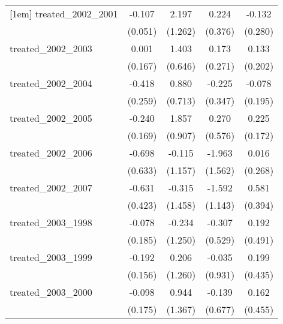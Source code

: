 {\begin{tabular}{l*{4}{c}}
[1em]
treated\_2002\_2001&      -0.107\sym{*}  &       2.197         &       0.224         &      -0.132         \\
            &     (0.051)         &     (1.262)         &     (0.376)         &     (0.280)         \\
[1em]
treated\_2002\_2003&       0.001         &       1.403\sym{*}  &       0.173         &       0.133         \\
            &     (0.167)         &     (0.646)         &     (0.271)         &     (0.202)         \\
[1em]
treated\_2002\_2004&      -0.418         &       0.880         &      -0.225         &      -0.078         \\
            &     (0.259)         &     (0.713)         &     (0.347)         &     (0.195)         \\
[1em]
treated\_2002\_2005&      -0.240         &       1.857\sym{*}  &       0.270         &       0.225         \\
            &     (0.169)         &     (0.907)         &     (0.576)         &     (0.172)         \\
[1em]
treated\_2002\_2006&      -0.698         &      -0.115         &      -1.963         &       0.016         \\
            &     (0.633)         &     (1.157)         &     (1.562)         &     (0.268)         \\
[1em]
treated\_2002\_2007&      -0.631         &      -0.315         &      -1.592         &       0.581         \\
            &     (0.423)         &     (1.458)         &     (1.143)         &     (0.394)         \\
[1em]
treated\_2003\_1998&      -0.078         &      -0.234         &      -0.307         &       0.192         \\
            &     (0.185)         &     (1.250)         &     (0.529)         &     (0.491)         \\
[1em]
treated\_2003\_1999&      -0.192         &       0.206         &      -0.035         &       0.199         \\
            &     (0.156)         &     (1.260)         &     (0.931)         &     (0.435)         \\
[1em]
treated\_2003\_2000&      -0.098         &       0.944         &      -0.139         &       0.162         \\
            &     (0.175)         &     (1.367)         &     (0.677)         &     (0.455)         \\

\end{tabular}}
